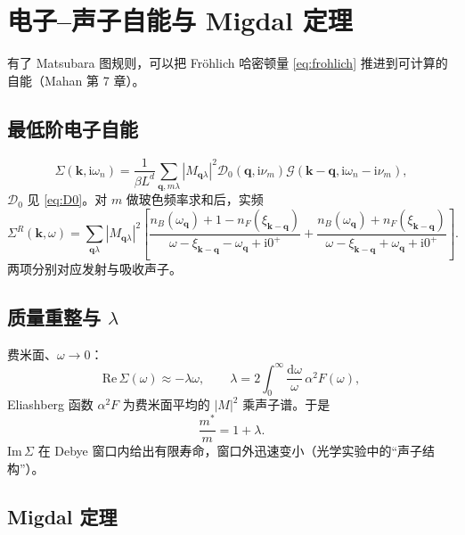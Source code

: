 \section{电子--声子自能与 Migdal 定理}

有了 Matsubara 图规则，可以把 Fröhlich 哈密顿量 \eqref{eq:frohlich} 推进到可计算的自能（Mahan 第 7 章）。

\subsection{最低阶电子自能}

\begin{equation}
  \Sigma(\mathbf{k},\mathrm{i}\omega_n)
  =\frac{1}{\beta L^d}
  \sum_{\mathbf{q},m\lambda}
  |M_{\mathbf{q}\lambda}|^2
  \mathcal{D}_0(\mathbf{q},\mathrm{i}\nu_m)
  \mathcal{G}(\mathbf{k}-\mathbf{q},\mathrm{i}\omega_n-\mathrm{i}\nu_m),
\label{eq:Sigma_ep}
\end{equation}
$\mathcal{D}_0$ 见 \eqref{eq:D0}。对 $m$ 做玻色频率求和后，实频
\begin{equation}
  \Sigma^R(\mathbf{k},\omega)
  =\sum_{\mathbf{q}\lambda}
  |M_{\mathbf{q}\lambda}|^2
  \left[
  \frac{n_B(\omega_{\mathbf{q}})+1-n_F(\xi_{\mathbf{k}-\mathbf{q}})}
  {\omega-\xi_{\mathbf{k}-\mathbf{q}}-\omega_{\mathbf{q}}+\mathrm{i}0^+}
  +\frac{n_B(\omega_{\mathbf{q}})+n_F(\xi_{\mathbf{k}-\mathbf{q}})}
  {\omega-\xi_{\mathbf{k}-\mathbf{q}}+\omega_{\mathbf{q}}+\mathrm{i}0^+}
  \right].
\label{eq:Sigma_ep_R}
\end{equation}
两项分别对应发射与吸收声子。

\subsection{质量重整与 \texorpdfstring{$\lambda$}{lambda}}

费米面、$\omega\to0$：
\begin{equation}
  \mathrm{Re}\,\Sigma(\omega)\approx-\lambda\omega,
  \qquad
  \lambda=2\int_0^{\infty}\frac{\mathrm{d}\omega}{\omega}\,\alpha^2F(\omega),
\label{eq:lambda}
\end{equation}
Eliashberg 函数 $\alpha^2F$ 为费米面平均的 $|M|^2$ 乘声子谱。于是
\begin{equation}
  \frac{m^*}{m}=1+\lambda.
\end{equation}
$\mathrm{Im}\,\Sigma$ 在 Debye 窗口内给出有限寿命，窗口外迅速变小（光学实验中的“声子结构”）。

\subsection{Migdal 定理}

